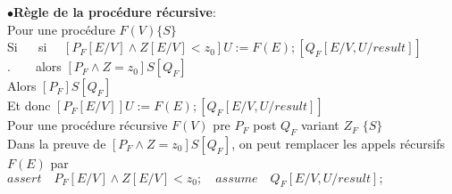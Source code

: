 $\bullet$\textbf{Règle de la procédure récursive}:\\
Pour une procédure $F(V) \{S\}$\\
Si $\quad$ si $ \quad [P_F[E/V] \wedge Z[E/V]<z_0] U :=F(E); [Q_F[E/V,U/result]] $\\ 
$.\quad \quad $alors $[P_F \wedge Z=z_0]S[Q_F]$\\
Alors $[P_F] S[Q_F]$\\
Et donc $[P_F[E/V]]U:=F(E);[Q_F[E/V,U/result]]$\\

Pour une procédure récursive $F(V)$ pre $P_F$ post $Q_F$ variant $Z_F$ $\{S\}$\\
Dans la preuve de $[P_F \wedge Z=z_0] S[Q_F]$, on peut remplacer les appels récursifs  $F(E)$ par\\  $assert \quad P_F[E/V] \wedge Z[E/V]<z_0; \quad assume \quad Q_F[E/V,U/result];$\\
